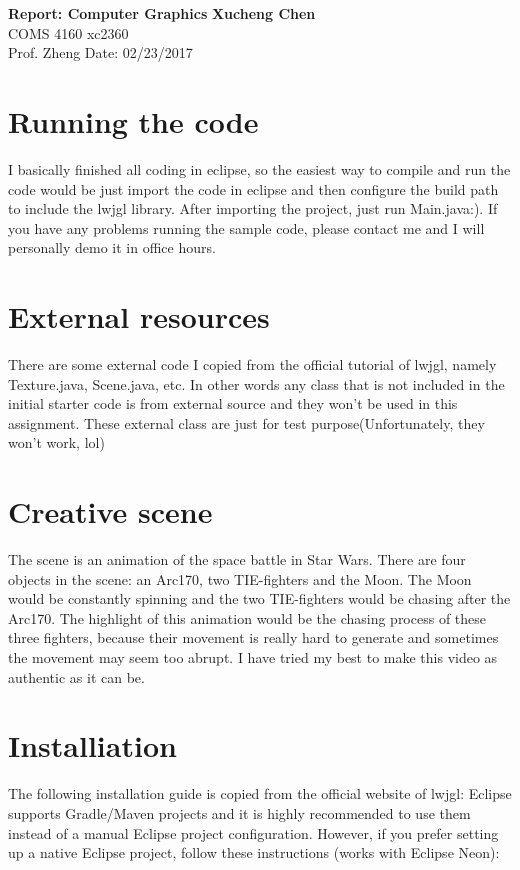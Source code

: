 \documentclass[a4paper, 11pt]{article}
\begin{document}
\noindent
\large\textbf{Report: Computer Graphics} \hfill \textbf{Xucheng Chen} \\
\normalsize COMS 4160 \hfill xc2360 \\
Prof. Zheng \hfill Date: 02/23/2017

\section*{Running the code}
    \indent I basically finished all coding in eclipse, so the easiest way to compile and run the code would be just import the code in eclipse and then configure the build path to include the lwjgl library. After importing the project, just run Main.java:). If you have any  problems running the sample code, please contact me and I will personally demo it in office hours.

\section*{External resources}
    \indent There are some external code I copied from the official tutorial of lwjgl, namely Texture.java, Scene.java, etc. In other words any class that is not included in the initial starter code is from external source and they won't be used in this assignment. These external class are just for test purpose(Unfortunately, they won't work, lol)

\section*{Creative scene}
    \indent The scene is an animation of the space battle in Star Wars. There are four objects in the scene: an Arc170, two TIE-fighters and the Moon. The Moon would be constantly spinning and the two TIE-fighters would be chasing after the Arc170. The highlight of this animation would be the chasing process of these three fighters, because their movement is really hard to generate and sometimes the movement may seem too abrupt. I have tried my best to make this video as authentic as it can be.

\section*{Installiation}
   \indent The following installation guide is copied from the official website of lwjgl: Eclipse supports Gradle/Maven projects and it is highly recommended to use them instead of a manual Eclipse project configuration. However, if you prefer setting up a native Eclipse project, follow these instructions (works with Eclipse Neon):
 
\end{document}
